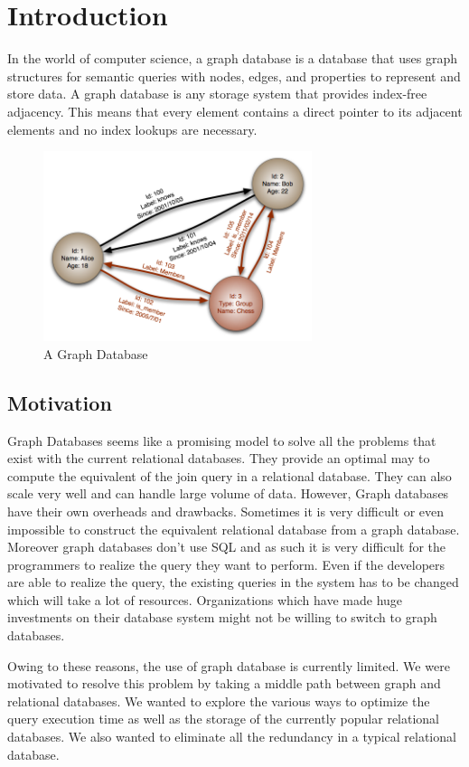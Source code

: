 \documentclass[12pt, oneside]{book}
\begin{document}
\chapter{Introduction}
In the world of computer science, a graph database is a database that uses graph structures for semantic queries with nodes, edges, and properties to represent and store data. A graph database is any storage system that provides index-free adjacency. This means that every element contains a direct pointer to its adjacent elements and no index lookups are necessary.
\begin{figure}[h]
 \begin{center}
  \includegraphics[width=0.7\textwidth]{pics/graph.png}
  \caption{A Graph Database}
 \end{center}
\end{figure}
\section{Motivation}
Graph Databases seems like a promising model to solve all the problems that exist with the current relational databases. They provide an optimal may to compute the equivalent of the join query in a relational database. They can also scale very well and can handle large volume of data. However, Graph databases have their own overheads and drawbacks. Sometimes it is very difficult or even impossible to construct the equivalent relational database from a graph database. Moreover graph databases don't use SQL and as such it is very difficult for the programmers to realize the query they want to perform. Even if the developers are able to realize the query, the existing queries in the system has to be changed which will take a lot of resources. Organizations which have made huge investments on their database system might not be willing to switch to graph databases. \\ \par
Owing to these reasons, the use of graph database is currently limited. We were motivated to resolve this problem by taking a middle path between graph and relational databases. We wanted to explore the various ways to optimize the query execution time as well as the storage of the currently popular relational databases. We also wanted to eliminate all the redundancy in a typical relational database.
\end{document}
